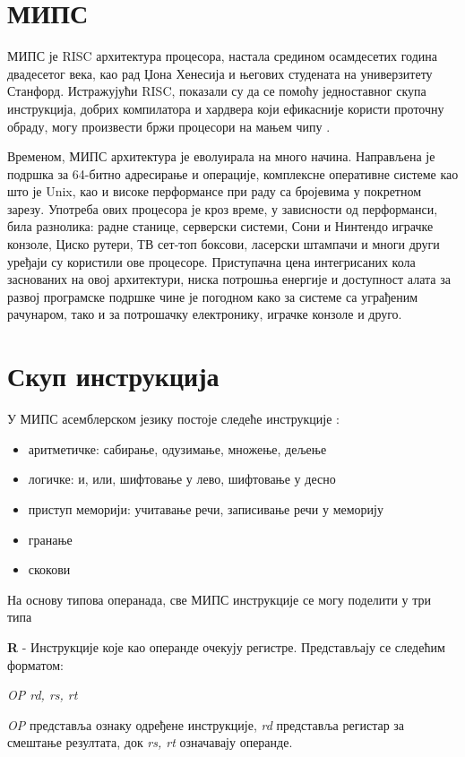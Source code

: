 \documentclass[12pt,oneside]{memoir}
\begin{document}
\section{МИПС}
\label{mips}
МИПС је RISC архитектура процесора, настала средином осамдесетих година двадесетог века, као рад Џона Хенесија и његових студената на универзитету Станфорд. Истражујући RISC, показали су да се помоћу једноставног скупа инструкција, добрих компилатора и хардвера који ефикасније користи проточну обраду, могу произвести бржи процесори на мањем чипу \cite{mips}.

Временом, МИПС архитектура је еволуирала на много начина. Направљена је подршка за 64-битно адресирање и операције, комплексне оперативне системе као што је Unix, као и високе перформансе при раду са бројевима у покретном зарезу. Употреба ових процесора је кроз време, у зависности од перформанси, била разнолика: радне станице, серверски системи, Сони и Нинтендо играчке конзоле, Циско рутери, ТВ сет-топ боксови, ласерски штампачи и многи други уређаји су користили ове процесоре\cite{mips}.
Приступачна цена интегрисаних кола заснованих на овој архитектури, ниска потрошња енергије и доступност алата за развој програмске подршке чине је погодном како за системе са уграђеним рачунаром, тако и за потрошачку електронику, играчке конзоле и друго.

\section{Скуп инструкција}
\label{instructions}
У МИПС асемблерском језику постоје следеће инструкције \cite{mips1}:
\begin{itemize}
\item аритметичке: сабирање, одузимање, множење, дељење
\item логичке: и, или, шифтовање у лево, шифтовање у десно
\item приступ меморији: учитавање речи, записивање речи у меморију
\item гранање
\item скокови
\end{itemize}
На основу типова операнада, све МИПС инструкције се могу поделити у три типа \cite{mips}

\textbf{R} - Инструкције које као операнде очекују регистре.
Представљају се следећим форматом:
\begin{listing}
\centering
\textit{OP rd, rs, rt}
\end{listing}

\textit{OP} представља ознаку одређене инструкције, \textit{rd} представља регистар за смештање резултата, док \textit{rs, rt} означавају операнде.
\end{document}
